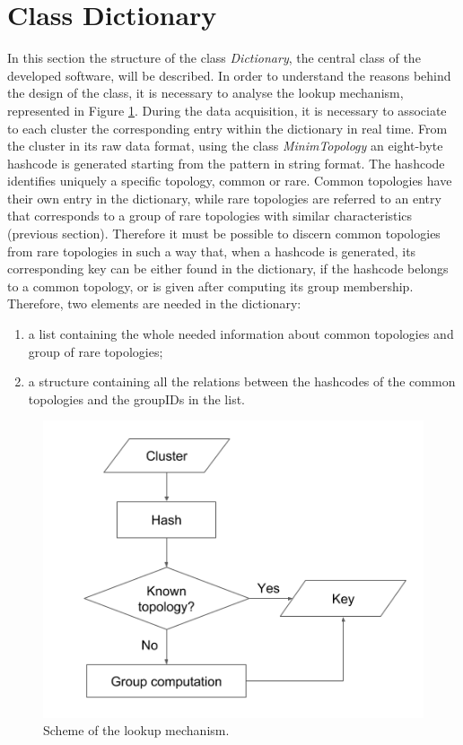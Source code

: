 \section{Class Dictionary}
\label{sec:dic}
In this section the structure of the class \textit{Dictionary}, the central class of the developed software, will be described. In order to understand the reasons behind the design of the class, it is necessary to analyse the lookup mechanism, represented in Figure \ref{fig:lucap}. During the data acquisition, it is necessary to associate to each cluster the corresponding entry within the dictionary in real time. From the cluster in its raw data format, using the class \textit{MinimTopology} an eight-byte hashcode is generated starting from the pattern in string format. The hashcode identifies uniquely a specific topology, common or rare.
Common topologies have their own entry in the dictionary, while rare topologies are referred to an entry that corresponds to a group of rare topologies with similar characteristics (previous section).
Therefore it must be possible to discern common topologies from rare topologies in such a way that, when a hashcode is generated, its corresponding key can be either found in the dictionary, if the hashcode belongs to a common topology, or is given after computing its group membership. Therefore, two elements are needed in the dictionary:
\begin{enumerate}
 \item a list containing the whole needed information about common topologies and group of rare topologies;
 \item a structure containing all the relations between the hashcodes of the common topologies and the groupIDs in the list.
\end{enumerate}
%
\begin{figure}
  \centering
  \includegraphics[scale=0.6]{figures/lucap.png}
  \caption{Scheme of the lookup mechanism.}
  \label{fig:lucap}
\end{figure}
%
